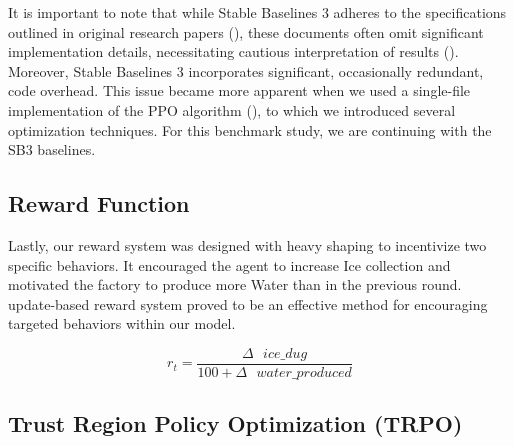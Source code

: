 \noindent It is important to note that while Stable Baselines 3 adheres to the specifications outlined in original research papers (\textcolor{deepblue}{\cite{stable-baselines3}}), these documents often omit significant implementation details, necessitating cautious interpretation of results (\textcolor{deepblue}{\cite{shengyi2022the37implementation}}). Moreover, Stable Baselines 3 incorporates significant, occasionally redundant, code overhead. This issue became more apparent when we used a single-file implementation of the PPO algorithm (\textcolor{deepblue}{\cite{huang2022cleanrl}}), to which we introduced several optimization techniques. For this benchmark study, we are continuing with the SB3 baselines.


\subsection{Reward Function}
\label{subsec:single-reward}

\noindent Lastly, our reward system was designed with heavy shaping to incentivize two specific behaviors. It encouraged the agent to increase Ice collection and motivated the factory to produce more Water than in the previous round.  update-based reward system proved to be an effective method for encouraging targeted behaviors within our model.


\begin{equation}
    r_t = \frac{\Delta \text{ } ice\_dug}{100 + \Delta \text{ } water\_produced}
    \label{eq:reward-function}
\end{equation}

\subsection{Trust Region Policy Optimization (TRPO)}
\label{sec:trpo}

